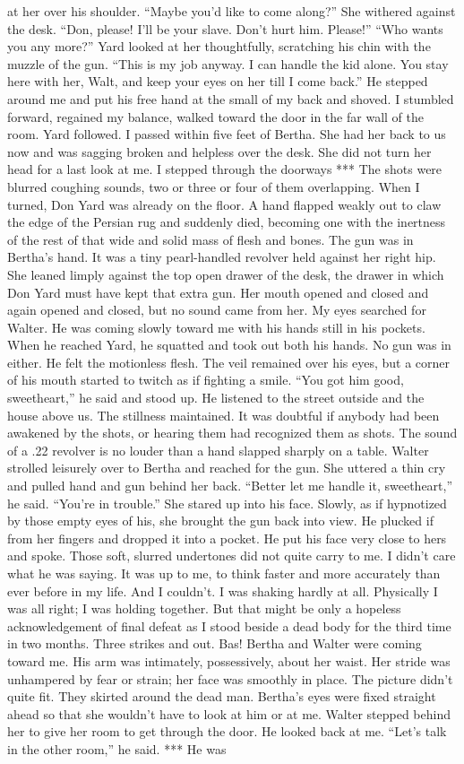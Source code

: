 \documentclass{novel}
\begin{document}
at her over his shoulder. “Maybe you’d like to come along?” She withered against the desk. “Don, please! I’ll be your slave. Don’t hurt him. Please!” “Who wants you any more?” Yard looked at her thoughtfully, scratching his chin with the muzzle of the gun. “This is my job anyway. I can handle the kid alone. You stay here with her, Walt, and keep your eyes on her till I come back.” He stepped around me and put his free hand at the small of my back and shoved. I stumbled forward, regained my balance, walked toward the door in the far wall of the room. Yard followed. I passed within five feet of Bertha. She had her back to us now and was sagging broken and helpless over the desk. She did not turn her head for a last look at me. I stepped through the doorways *** The shots were blurred coughing sounds, two or three or four of them overlapping. When I turned, Don Yard was already on the floor. A hand flapped weakly out to claw the edge of the Persian rug and suddenly died, becoming one with the inertness of the rest of that wide and solid mass of flesh and bones. The gun was in Bertha’s hand. It was a tiny pearl-handled revolver held against her right hip. She leaned limply against the top open drawer of the desk, the drawer in which Don Yard must have kept that extra gun. Her mouth opened and closed and again opened and closed, but no sound came from her. My eyes searched for Walter. He was coming slowly toward me with his hands still in his pockets. When he reached Yard, he squatted and took out both his hands. No gun was in either. He felt the motionless flesh. The veil remained over his eyes, but a corner of his mouth started to twitch as if fighting a smile. “You got him good, sweetheart,” he said and stood up. He listened to the street outside and the house above us. The stillness maintained. It was doubtful if anybody had been awakened by the shots, or hearing them had recognized them as shots. The sound of a .22 revolver is no louder than a hand slapped sharply on a table. Walter strolled leisurely over to Bertha and reached for the gun. She uttered a thin cry and pulled hand and gun behind her back. “Better let me handle it, sweetheart,” he said. “You’re in trouble.” She stared up into his face. Slowly, as if hypnotized by those empty eyes of his, she brought the gun back into view. He plucked if from her fingers and dropped it into a pocket. He put his face very close to hers and spoke. Those soft, slurred undertones did not quite carry to me. I didn’t care what he was saying. It was up to me, to think faster and more accurately than ever before in my life. And I couldn’t. I was shaking hardly at all. Physically I was all right; I was holding together. But that might be only a hopeless acknowledgement of final defeat as I stood beside a dead body for the third time in two months. Three strikes and out. Bas! Bertha and Walter were coming toward me. His arm was intimately, possessively, about her waist. Her stride was unhampered by fear or strain; her face was smoothly in place. The picture didn’t quite fit. They skirted around the dead man. Bertha’s eyes were fixed straight ahead so that she wouldn’t have to look at him or at me. Walter stepped behind her to give her room to get through the door. He looked back at me. “Let’s talk in the other room,” he said. *** He was 
\end{document}
